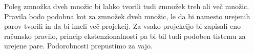 Poleg zmnožka dveh množic bi lahko tvorili tudi zmnožek treh ali več množic. Pravila bodo
podobna kot za zmnožek dveh množic, le da bi namesto urejenih parov tvorili  in da bi imeli več projekcij. Za vsako projekcijo bi zapisali eno računsko
pravilo, princip ekstenzionalnosti pa bi bil tudi podoben tistemu za urejene pare.
Podorobnosti prepustimo za vajo.















